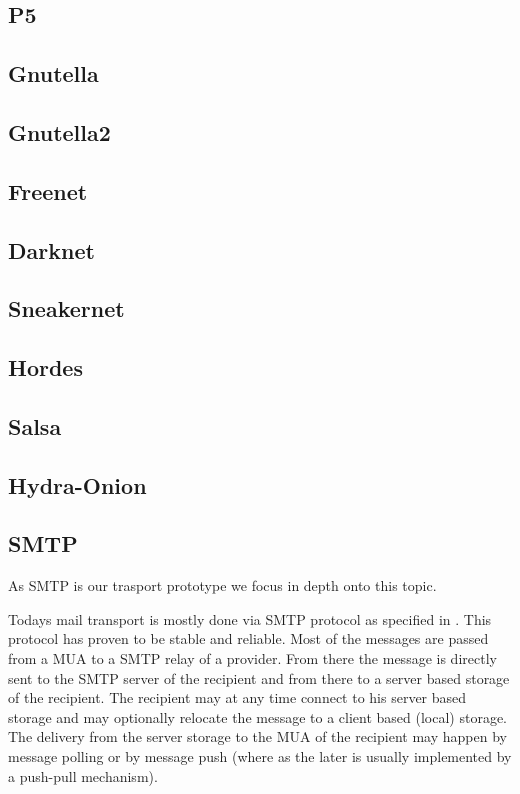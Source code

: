 \subsection{P5}

\subsection{Gnutella}

\subsection{Gnutella2}

\subsection{Freenet}

\subsection{Darknet}

\subsection{Sneakernet}

\subsection{Hordes}

\subsection{Salsa}

\subsection{Hydra-Onion}

\subsection{SMTP}
As SMTP is our trasport prototype we focus in depth onto this topic.

Todays mail transport is mostly done via SMTP protocol as specified in \cite{RFC5321}. This protocol has proven to be stable and reliable. Most of the messages are passed from a MUA to a SMTP relay of a provider. From there the message is directly sent to the SMTP server of the recipient and from there to a server based storage of the recipient. The recipient may at any time connect to his server based storage and may optionally relocate the message to a client based (local) storage. The delivery from the server storage to the MUA of the recipient may happen by message polling or by message push (where as the later is usually implemented by a push-pull mechanism).\par

